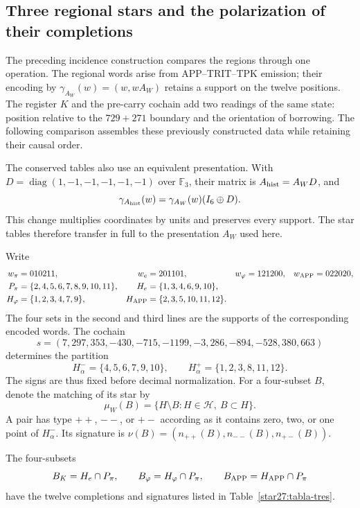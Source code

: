 \subsection{Three regional stars and the polarization of their completions}
\label{star27:comparacion}

The preceding incidence construction compares the regions through one
operation. The regional words arise from APP--TRIT--TPK emission;
their encoding by \(\gamma_{A_W}(w)=(w,wA_W)\) retains a support
on the twelve positions. The register \(K\) and the pre-carry
cochain add two readings of the same state: position relative to
the \(729+271\) boundary and the orientation of borrowing.
The following comparison assembles these previously constructed
data while retaining their causal order.

The conserved tables also use an equivalent presentation. With
\(D=\operatorname{diag}(1,-1,-1,-1,-1,-1)\) over
\(\mathbb F_3\), their matrix is \(A_{\rm hist}=A_WD\), and
\[
\gamma_{A_{\rm hist}}(w)=\gamma_{A_W}(w)(I_6\oplus D).
\]
This change multiplies coordinates by units and preserves every
support. The star tables therefore transfer in full to the
presentation \(A_W\) used here.

Write
\[
\begin{aligned}
w_\pi&=010211,&w_e&=201101,&
w_\varphi&=121200,&w_{\rm APP}&=022020,\\
P_\pi&=\{2,4,5,6,7,8,9,10,11\},&
H_e&=\{1,3,4,6,9,10\},\\
H_\varphi&=\{1,2,3,4,7,9\},&
H_{\rm APP}&=\{2,3,5,10,11,12\}.
\end{aligned}
\]
The four sets in the second and third lines are the supports of
the corresponding encoded words. The cochain
\[
s=(7,297,353,-430,-715,-1199,-3,286,-894,-528,380,663)
\]
determines the partition
\[
H^-_\alpha=\{4,5,6,7,9,10\},\qquad
H^+_\alpha=\{1,2,3,8,11,12\}.
\]
The signs are thus fixed before decimal normalization. For a
four-subset \(B\), denote the matching of its star by
\[
\mu_W(B)=\{H\setminus B:H\in\mathcal H,\ B\subset H\}.
\]
A pair has type \(++\), \(--\), or \(+-\) according as it
contains zero, two, or one point of \(H^-_\alpha\).
Its signature is
\(\nu(B)=(n_{++}(B),n_{--}(B),n_{+-}(B))\).

\begin{proposition}
\label{star27:tres}
The four-subsets
\[
B_K=H_e\cap P_\pi,\qquad
B_\varphi=H_\varphi\cap P_\pi,\qquad
B_{\rm APP}=H_{\rm APP}\cap P_\pi
\]
have the twelve completions and signatures listed in
Table~\ref{star27:tabla-tres}.
\end{proposition}

